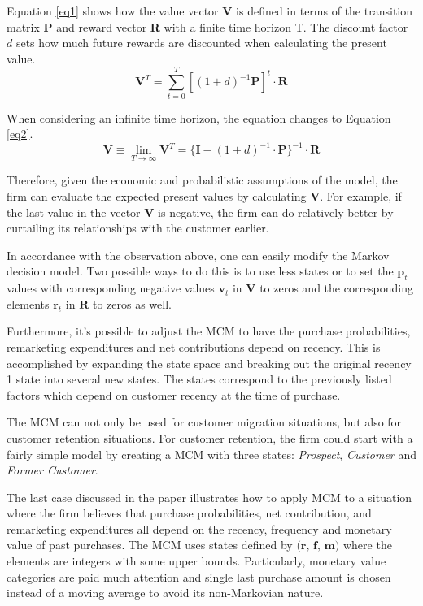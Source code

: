 \documentclass[11pt]{article}
\begin{document}
Equation \ref{eq1} shows how the value vector \textbf{V} is defined in terms of the transition matrix \textbf{P} and reward vector \textbf{R} with a finite time horizon T.
The discount factor $d$ sets how much future rewards are discounted when calculating the present value.
\begin{equation}\label{eq1}
\textbf{V}^T = \sum_{t=0}^T  [(1 + d)^{-1} \textbf{P}]^t \cdot \textbf{R}
\end{equation}

When considering an infinite time horizon, the equation changes to Equation \ref{eq2}.
\begin{equation}\label{eq2}
\textbf{V} \equiv \lim_{T \rightarrow \infty} \textbf{V}^T = \{\textbf{I} - (1 + d)^{-1} \cdot \textbf{P} \}^{-1} \cdot \textbf{R}
\end{equation}


Therefore, given the economic and probabilistic assumptions of the model, the firm can evaluate the expected present values by calculating $\textbf{V}$. For example, if the last value in the vector $\textbf{V}$ is negative, the firm can do relatively better by curtailing its relationships with the customer earlier.

In accordance with the observation above, one can easily modify the Markov decision model. Two possible ways to do this is to use less states or to set the $\textbf{p}_t$ values with corresponding negative values $\textbf{v}_t$ in $\textbf{V}$ to zeros and the corresponding elements $\textbf{r}_t$ in $\textbf{R}$ to zeros as well.%

Furthermore, it's possible to  adjust the MCM to have the purchase probabilities, remarketing expenditures and net contributions depend on recency. 
This is accomplished by expanding the state space and breaking out the original recency 1 state into several new states. 
The states correspond to the previously listed factors which depend on customer recency at the time of purchase. 

The MCM can not only be used for customer migration situations, but also for customer retention situations. For customer retention, the firm could start with a fairly simple model by creating a MCM with three states:  \textit{Prospect}, \textit{Customer} and \textit{Former Customer}. %

The last case discussed in the paper illustrates how to apply MCM to a situation where the firm believes that purchase probabilities, net contribution, and remarketing expenditures all depend on the recency, frequency and monetary value of past purchases. The MCM uses states defined by $\textbf{(r, f, m)}$ where the elements are integers with some upper bounds. Particularly, monetary value categories are paid much attention and single last purchase amount is chosen instead of a moving average to avoid its non-Markovian nature.
\end{document}
